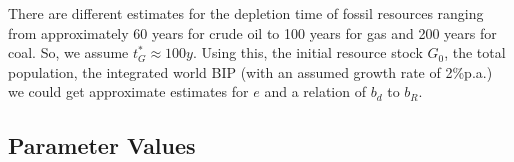 There are different estimates for the depletion time of fossil resources ranging from approximately 60 years for crude oil to 100 years for gas and 200 years for coal.
So, we assume $t^*_G \approx 100y$. Using this, the initial resource stock $G_0$, the total population, the integrated world BIP (with an assumed growth rate of 2\%p.a.) we could get approximate estimates for $e$ and a relation of $b_d$ to  $b_R$.


\subsection{Parameter Values}

